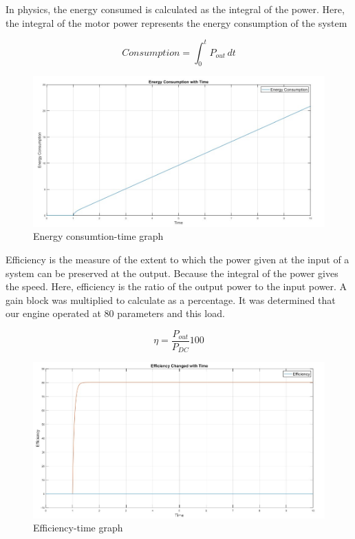 In physics, the energy consumed is calculated as the integral of the power. Here, the integral of
the motor power represents the energy consumption of the system

\begin{equation}
Consumption = \int_0^t P_{out} \, dt 
\end{equation}

\begin{figure}[H]
    \centering
    \includegraphics[width=0.7\columnwidth]{imgs/io/j.jpg}
    \caption[Energy consumtion-time graph]{Energy consumtion-time graph}
    \label{fig-magnitude}
\end{figure}%

Efficiency is the measure of the extent to which the power given at the input of a system can be
preserved at the output. Because the integral of the power gives the speed. Here, efficiency is
the ratio of the output power to the input power. A gain block was multiplied to calculate as a
percentage. It was determined that our engine operated at 80%
parameters and this load.

\begin{equation}
\eta = \frac{P_{out}}{P_{DC}} 100    
\end{equation}

\begin{figure}[H]
    \centering
    \includegraphics[width=0.7\columnwidth]{imgs/io/k.jpg}
    \caption[Efficiency-time graph]{Efficiency-time graph}
    \label{fig-magnitude}
\end{figure}%





